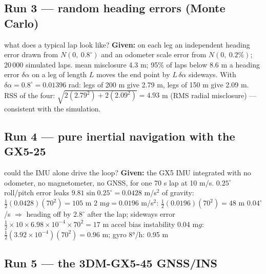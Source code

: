 \subsection*{Run 3 --- random heading errors (Monte Carlo)}
\begin{worked}{what does a typical lap look like?}
\textbf{Given:} on each leg an independent heading error drawn from $N(0,\ 0.8^\circ)$ and an odometer scale error from $N(0,\ 0.2\%)$; 20\,000 simulated laps.
 mean misclosure 4.3 m; 95\% of laps below 8.6 m
 a heading error $\delta\alpha$ on a leg of length $L$ moves the end point by $L\,\delta\alpha$ sideways. With $\delta\alpha=0.8^\circ=0.01396$ rad: legs of 200 m give 2.79 m, legs of 150 m give 2.09 m. RSS of the four: $\sqrt{2(2.79^2)+2(2.09^2)}=4.93$ m (RMS radial misclosure) --- consistent with the simulation.
\end{worked}

\subsection*{Run 4 --- pure inertial navigation with the GX5-25}

\begin{worked}{could the IMU alone drive the loop?}
\textbf{Given:} the GX5 IMU integrated with no odometer, no magnetometer, no GNSS, for one 70 s lap at 10 m/s.
 $0.25^\circ$ roll/pitch error leaks $9.81\sin0.25^\circ=0.0428$ m/s$^2$ of gravity: $\tfrac12(0.0428)(70^2)=105$ m
 $2$ m$g=0.0196$ m/s$^2$: $\tfrac12(0.0196)(70^2)=48$ m
 $0.04^\circ$/s $\Rightarrow$ heading off by $2.8^\circ$ after the lap; sideways error $\tfrac12\times10\times6.98\times10^{-4}\times70^2=17$ m
 accel bias instability 0.04 m$g$: $\tfrac12(3.92\times10^{-4})(70^2)=0.96$ m; gyro 8°/h: 0.95 m
\end{worked}

\subsection*{Run 5 --- the 3DM-GX5-45 GNSS/INS}


